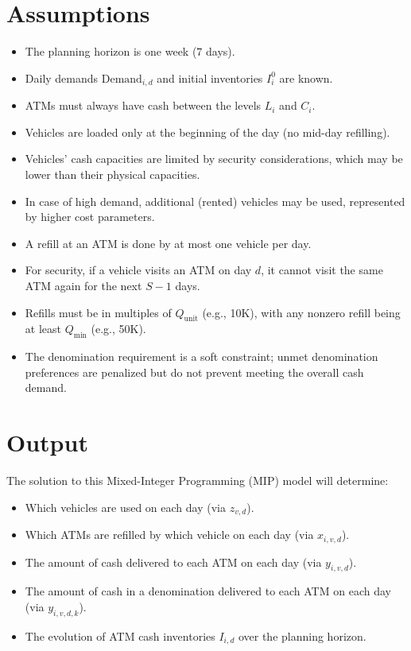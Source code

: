 \documentclass[11pt]{article}
\begin{document}
\section*{Assumptions}
\begin{itemize}[leftmargin=1.5cm]
    \item The planning horizon is one week (\(7\) days).
    \item Daily demands \(\text{Demand}_{i,d}\) and initial inventories \(I_i^0\) are known.
    \item ATMs must always have cash between the levels \(L_i\) and \(C_i\).
    \item Vehicles are loaded only at the beginning of the day (no mid-day refilling).
    \item Vehicles' cash capacities are limited by security considerations, which may be lower than their physical capacities.
    \item In case of high demand, additional (rented) vehicles may be used, represented by higher cost parameters.
    \item A refill at an ATM is done by at most one vehicle per day.
    \item For security, if a vehicle visits an ATM on day \(d\), it cannot visit the same ATM again for the next \(S-1\) days.
    \item Refills must be in multiples of \(Q_{\text{unit}}\) (e.g., 10K), with any nonzero refill being at least \(Q_{\min}\) (e.g., 50K).
    \item The denomination requirement is a soft constraint; unmet denomination preferences are penalized but do not prevent meeting the overall cash demand.
\end{itemize}

\section*{Output}
The solution to this Mixed-Integer Programming (MIP) model will determine:
\begin{itemize}[leftmargin=1.5cm]
    \item Which vehicles are used on each day (via \(z_{v,d}\)).
    \item Which ATMs are refilled by which vehicle on each day (via \(x_{i,v,d}\)).
    \item The amount of cash delivered to each ATM on each day (via \(y_{i,v,d}\)).
    \item The amount of cash in a denomination delivered to each ATM on each day (via \(y_{i,v,d,k}\)).
    \item The evolution of ATM cash inventories \(I_{i,d}\) over the planning horizon.
\end{itemize}
\end{document}
